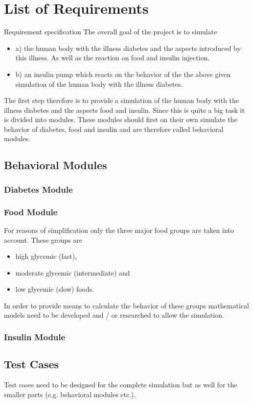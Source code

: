 \section{List of Requirements}
Requirement specification 
The overall goal of the project is to simulate
\begin{itemize}
  \item a) the human body with the illness diabetes and the aspects introduced
  by this illness. As well as the reaction on food and insulin injection.
  \item b) an insulin pump which reacts on the behavior of the the above given
  simulation of the human body with the illness diabetes.
\end{itemize}
The first step therefore is to provide a simulation of the human body with the
illness diabetes and the aspects food and insulin. 
Since this is quite a big task it is divided into modules. These modules should
first on their own simulate the behavior of diabetes, food and insulin and are
therefore called behavioral modules.

\subsection{Behavioral Modules}

\subsubsection{Diabetes Module}

\subsubsection{Food Module}
For reasons of simplification only the three major food groups are taken into
account.
These groups are 
\begin{itemize}
  \item high glycemic (fast),
  \item moderate glycemic (intermediate) and
  \item low glycemic (slow) foods.
\end{itemize}
In order to provide means to calculate the behavior of these groups
mathematical models need to be developed and / or researched to allow the
simulation.

\subsubsection{Insulin Module}

\subsection{Test Cases}
Test cases need to be designed for the complete simulation but as well for the
smaller parts (e.g. behavioral modules etc.).